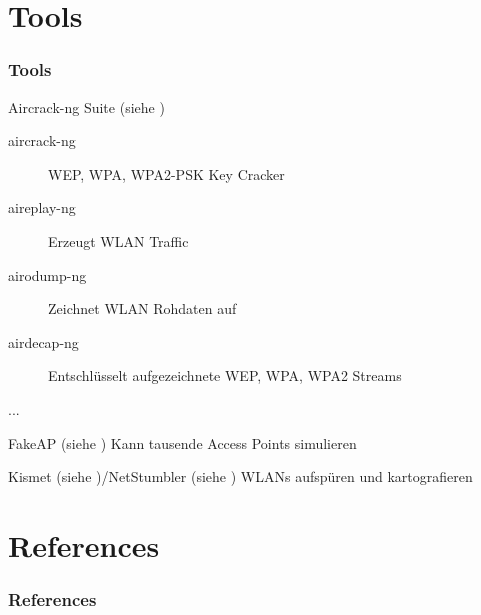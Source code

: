 \documentclass{beamer}
\begin{document}
\section{Tools}
\begin{frame}
\frametitle{Tools}
\begin{block}{Aircrack-ng Suite (siehe \cite{aircrack})}
	\begin{description}
		\item[aircrack-ng] WEP, WPA, WPA2-PSK Key Cracker
		\item[aireplay-ng] Erzeugt WLAN Traffic
		\item[airodump-ng] Zeichnet WLAN Rohdaten auf
		\item[airdecap-ng] Entschlüsselt aufgezeichnete WEP, WPA, WPA2 Streams
		\item[...]
	\end{description}
\end{block}
\begin{block}{FakeAP (siehe \cite{fakeap})}
Kann tausende Access Points simulieren
\end{block}
\begin{block}{Kismet (siehe \cite{kismet})/NetStumbler (siehe \cite{netstumbler})}
WLANs aufspüren und kartografieren
\end{block}
\end{frame}

\section{References}
\begin{frame}[allowframebreaks]
\frametitle{References}


\end{frame}
\end{document}
